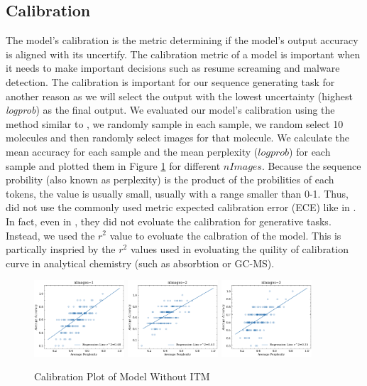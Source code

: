 \documentclass[12pt]{article}
\begin{document}
\subsection{Calibration}
The model's calibration is the metric determining if the model's output accuracy is aligned with its uncertify.  The calibration metric of a model is important when it needs to make important decisions such as resume screaming and malware detection. \autocite{liang_holistic_2023} The calibration is important for our sequence generating task for another reason as we will select the output with the lowest uncertainty (highest \textit{logprob}) as the final output. We evaluated our model's calibration using the method similar to \cite{liang_holistic_2023}, we randomly sample  in each sample, we random select 10 molecules and then randomly select images for that molecule. We calculate the mean accuracy for each sample and the mean perplexity ($logprob$) for each sample and plotted them in Figure \ref{fig:cal1} for different $nImages$. Because the sequence probility (also known as perplexity) is the product of the probilities of each tokens, the value is usually small, usually with a range smaller than 0-1. Thus, did not use the commonly used metric expected calibration error (ECE) like in \cite{liang_holistic_2023}. In fact, even in \autocite{liang_holistic_2023}, they did not evoluate the calibration for generative tasks. Instead, we used the $r^2$ value to evoluate the calbration of the model. This is partically inspried by the $r^2$ values used in evoluating the quility of calibration curve in analytical chemistry (such as absorbtion or GC-MS). 
\begin{figure}
    \centering
    \includegraphics[width=0.3\textwidth]{caln1.png}
    \includegraphics[width=0.3\textwidth]{caln2.png}
    \includegraphics[width=0.3\textwidth]{caln3.png}
    \caption{Calibration Plot of Model Without ITM}
    \label{fig:cal1}
\end{figure}
\end{document}
